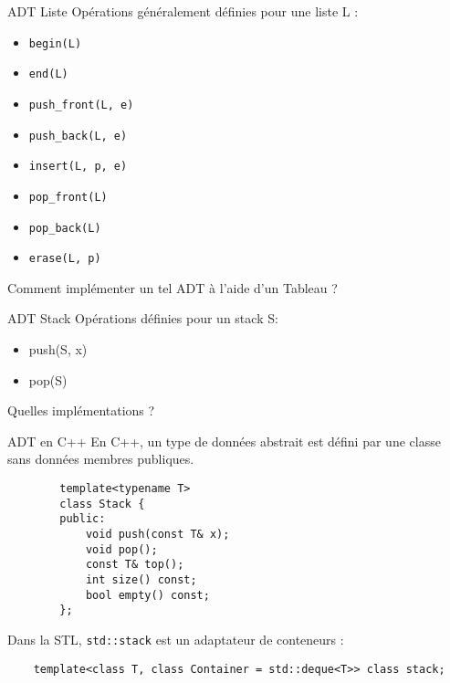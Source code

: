 \documentclass[handout]{beamer}
\begin{document}
\begin{frame}[t]{ADT Liste}
    Opérations généralement définies pour une liste L :
    \begin{itemize}
        \item \lstinline{begin(L)}
        \item \lstinline{end(L)}
        \item \lstinline{push_front(L, e)}
        \item \lstinline{push_back(L, e)}
        \item \lstinline{insert(L, p, e)}
        \item \lstinline{pop_front(L)}
        \item \lstinline{pop_back(L)}
        \item \lstinline{erase(L, p)}
    \end{itemize}
    Comment implémenter un tel ADT à l'aide d'un Tableau ?
\end{frame}

\begin{frame}[t]{ADT Stack}
    Opérations définies pour un stack S:
    \begin{itemize}
        \item push(S, x)
        \item pop(S)
    \end{itemize}

    Quelles implémentations ?
\end{frame}

\begin{frame}[fragile]{ADT en C++}
    En C++, un type de données abstrait est défini par une classe sans données membres publiques.
    \begin{lstlisting}
        template<typename T>
        class Stack {
        public:
            void push(const T& x);
            void pop();
            const T& top();
            int size() const;
            bool empty() const;
        };
    \end{lstlisting}
    Dans la STL, \lstinline{std::stack} est un adaptateur de conteneurs :
    \begin{lstlisting}
    template<class T, class Container = std::deque<T>> class stack;
    \end{lstlisting}
\end{frame}
\end{document}
